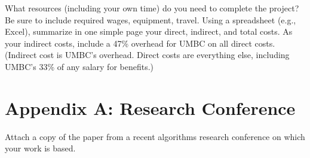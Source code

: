 \documentclass[a4paper,11pt]{article}
\begin{document}
What resources (including your own time) do you need to complete the project? Be sure to include
required wages, equipment, travel. Using a spreadsheet (e.g., Excel), summarize in one simple page your
direct, indirect, and total costs. As your indirect costs, include a 47\% overhead for UMBC on all direct
costs. (Indirect cost is UMBC’s overhead. Direct costs are everything else, including UMBC’s 33\% of
any salary for benefits.)


\section{Appendix A: Research Conference}
Attach a copy of the paper from a recent algorithms research conference on which your work is based.
\end{document}
